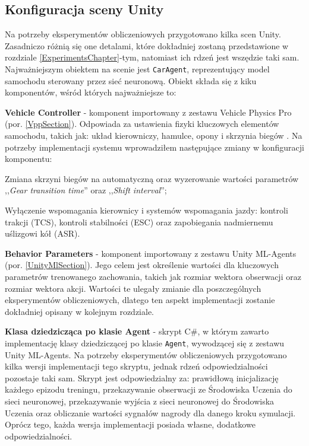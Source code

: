 \subsection{Konfiguracja sceny Unity}
Na potrzeby eksperymentów obliczeniowych przygotowano kilka scen Unity. Zasadniczo różnią się one detalami, które dokładniej zostaną przedstawione w rozdziale \ref{ExperimentsChapter}-tym, natomiast ich rdzeń jest wszędzie taki sam. Najważniejszym obiektem na scenie jest \texttt{CarAgent}, reprezentujący model samochodu sterowany przez sieć neuronową. Obiekt składa się z kiku komponentów, wśród których najważniejsze to:
\vspace{-0.5cm}
\begin{enumerate*}
\item \textbf{Vehicle Controller} - komponent importowany z zestawu Vehicle Physics Pro (por. \ref{VppSection}). Odpowiada za ustawienia fizyki kluczowych elementów samochodu, takich jak: układ kierowniczy, hamulce, opony i skrzynia biegów \cite{vpp:vehicleController}. Na potrzeby implementacji systemu wprowadziłem następujące zmiany w konfiguracji komponentu:
\begin{itemize*}
\item Zmiana skrzyni biegów na automatyczną oraz wyzerowanie wartości parametrów ,,\textit{Gear transition time}'' oraz ,,\textit{Shift interval}'';
\item Wyłączenie wspomagania kierownicy i systemów wspomagania jazdy: kontroli trakcji (TCS), kontroli stabilności (ESC) oraz zapobiegania nadmiernemu uślizgowi kół (ASR).
\end{itemize*}
\item \textbf{Behavior Parameters} - komponent importowany z zestawu Unity ML-Agents (por. \ref{UnityMlSection}). Jego celem jest określenie wartości dla kluczowych parametrów trenowanego zachowania, takich jak rozmiar wektora obserwacji oraz rozmiar wektora akcji. Wartości te ulegały zmianie dla poszczególnych eksperymentów obliczeniowych, dlatego ten aspekt implementacji zostanie dokładniej opisany w kolejnym rozdziale.
\item \textbf{Klasa dziedzicząca po klasie Agent} - skrypt C\#, w którym zawarto implementację klasy dziedziczącej po klasie \texttt{Agent}, wywodzącej się z zestawu Unity ML-Agents. Na potrzeby eksperymentów obliczeniowych przygotowano kilka wersji implementacji tego skryptu, jednak rdzeń odpowiedzialności pozostaje taki sam. Skrypt jest odpowiedzialny za: prawidłową inicjalizację każdego epizodu treningu, przekazywanie obserwacji ze Środowiska Uczenia do sieci neuronowej, przekazywanie wyjścia z sieci neuronowej do Środowiska Uczenia oraz obliczanie wartości sygnałów nagrody dla danego kroku symulacji. Oprócz tego, każda wersja implementacji posiada własne, dodatkowe odpowiedzialności.

\end{enumerate*}
